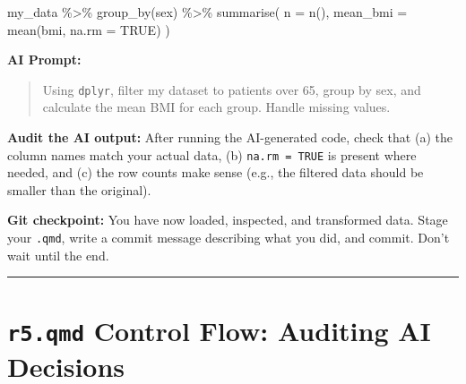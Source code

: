 \documentclass[
  letterpaper,
  DIV=11,
  numbers=noendperiod,
  oneside]{scrreprt}
\newenvironment{Shaded}{\begin{snugshade}}{\end{snugshade}}
\newcommand{\AttributeTok}[1]{\textcolor[rgb]{0.40,0.45,0.13}{#1}}
\newcommand{\ConstantTok}[1]{\textcolor[rgb]{0.56,0.35,0.01}{#1}}
\newcommand{\FunctionTok}[1]{\textcolor[rgb]{0.28,0.35,0.67}{#1}}
\newcommand{\NormalTok}[1]{\textcolor[rgb]{0.00,0.23,0.31}{#1}}
\newcommand{\SpecialCharTok}[1]{\textcolor[rgb]{0.37,0.37,0.37}{#1}}
\begin{document}
\begin{Shaded}
\begin{Highlighting}[numbers=left,,]
\NormalTok{my\_data }\SpecialCharTok{\%\textgreater{}\%}
  \FunctionTok{group\_by}\NormalTok{(sex) }\SpecialCharTok{\%\textgreater{}\%}
  \FunctionTok{summarise}\NormalTok{(}
    \AttributeTok{n =} \FunctionTok{n}\NormalTok{(),}
    \AttributeTok{mean\_bmi =} \FunctionTok{mean}\NormalTok{(bmi, }\AttributeTok{na.rm =} \ConstantTok{TRUE}\NormalTok{)}
\NormalTok{  )}
\end{Highlighting}
\end{Shaded}

\textbf{AI Prompt:}

\begin{quote}
Using \texttt{dplyr}, filter my dataset to patients over 65, group by
sex, and calculate the mean BMI for each group. Handle missing values.
\end{quote}

\begin{tcolorbox}[enhanced jigsaw, opacitybacktitle=0.6, colbacktitle=quarto-callout-tip-color!10!white, breakable, opacityback=0, coltitle=black, toptitle=1mm, bottomrule=.15mm, colframe=quarto-callout-tip-color-frame, bottomtitle=1mm, colback=white, leftrule=.75mm, rightrule=.15mm, title=\textcolor{quarto-callout-tip-color}{\faLightbulb}\hspace{0.5em}{Tip}, left=2mm, arc=.35mm, toprule=.15mm, titlerule=0mm]

\textbf{Audit the AI output:} After running the AI-generated code, check
that (a) the column names match your actual data, (b)
\texttt{na.rm\ =\ TRUE} is present where needed, and (c) the row counts
make sense (e.g., the filtered data should be smaller than the
original).

\end{tcolorbox}

\textbf{Git checkpoint:} You have now loaded, inspected, and transformed
data. Stage your \texttt{.qmd}, write a commit message describing what
you did, and commit. Don't wait until the end.

\begin{center}\rule{0.5\linewidth}{0.5pt}\end{center}

\section*{\texorpdfstring{\texttt{r5.qmd} Control Flow: Auditing AI
Decisions}{r5.qmd Control Flow: Auditing AI Decisions}}\label{r5.qmd-control-flow-auditing-ai-decisions}
\end{document}
